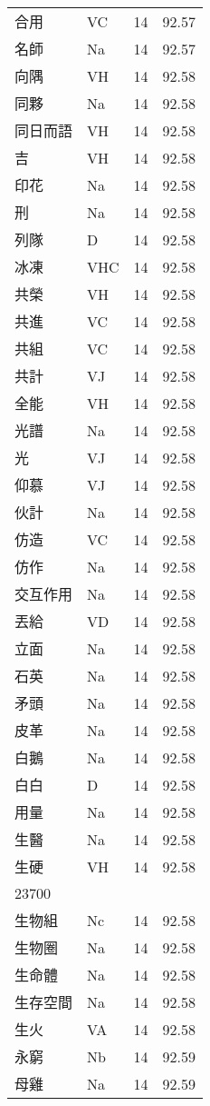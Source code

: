 \documentclass[twocolumn]{book}
\begin{document}
\begin{supertabular}{llrr}
合用 & VC & 14 &  92.57\\
名師 & Na & 14 &  92.57\\
向隅 & VH & 14 &  92.58\\
同夥 & Na & 14 &  92.58\\
同日而語 & VH & 14 &  92.58\\
吉 & VH & 14 &  92.58\\
印花 & Na & 14 &  92.58\\
刑 & Na & 14 &  92.58\\
列隊 & D & 14 &  92.58\\
冰凍 & VHC & 14 &  92.58\\
共榮 & VH & 14 &  92.58\\
共進 & VC & 14 &  92.58\\
共組 & VC & 14 &  92.58\\
共計 & VJ & 14 &  92.58\\
全能 & VH & 14 &  92.58\\
光譜 & Na & 14 &  92.58\\
光 & VJ & 14 &  92.58\\
仰慕 & VJ & 14 &  92.58\\
伙計 & Na & 14 &  92.58\\
仿造 & VC & 14 &  92.58\\
仿作 & Na & 14 &  92.58\\
交互作用 & Na & 14 &  92.58\\
丟給 & VD & 14 &  92.58\\
立面 & Na & 14 &  92.58\\
石英 & Na & 14 &  92.58\\
矛頭 & Na & 14 &  92.58\\
皮革 & Na & 14 &  92.58\\
白鵝 & Na & 14 &  92.58\\
白白 & D & 14 &  92.58\\
用量 & Na & 14 &  92.58\\
生醫 & Na & 14 &  92.58\\
生硬 & VH & 14 &  92.58\\
23700\\
生物組 & Nc & 14 &  92.58\\
生物圈 & Na & 14 &  92.58\\
生命體 & Na & 14 &  92.58\\
生存空間 & Na & 14 &  92.58\\
生火 & VA & 14 &  92.58\\
永窮 & Nb & 14 &  92.59\\
母雞 & Na & 14 &  92.59\\

\end{supertabular}
\end{document}
